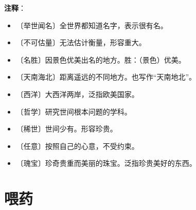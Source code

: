 \documentclass[12pt,UTF-8,openany]{ctexbook}
\begin{document}
\newpage

\textbf{注释}：

\vspace{-1em}

\begin{itemize}
    \setlength\itemsep{-0.2em}
    \item 〔举世闻名〕全世界都知道名字，表示很有名。
    \item 〔不可估量〕无法估计衡量，形容重大。
    \item 〔名胜〕因景色优美出名的地方。胜：（景色）优美。
    \item 〔天南海北〕距离遥远的不同地方。也写作“天南地北”。
    \item 〔西洋〕大西洋两岸，泛指欧美国家。
    \item 〔哲学〕研究世间根本问题的学科。
    \item 〔稀世〕世间少有。形容珍贵。
    \item 〔任意〕按照自己的心意，不受约束。
    \item 〔瑰宝〕珍奇贵重而美丽的珠宝。泛指珍贵美好的东西。
\end{itemize}

\chapter{喂药}
\end{document}
